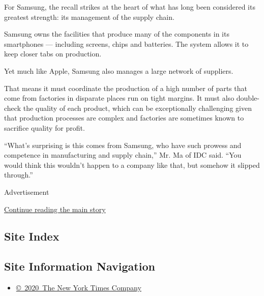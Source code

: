 For Samsung, the recall strikes at the heart of what has long been
considered its greatest strength: its management of the supply chain.

Samsung owns the facilities that produce many of the components in its
smartphones --- including screens, chips and batteries. The system
allows it to keep closer tabs on production.

Yet much like Apple, Samsung also manages a large network of suppliers.

That means it must coordinate the production of a high number of parts
that come from factories in disparate places run on tight margins. It
must also double-check the quality of each product, which can be
exceptionally challenging given that production processes are complex
and factories are sometimes known to sacrifice quality for profit.

``What's surprising is this comes from Samsung, who have such prowess
and competence in manufacturing and supply chain,'' Mr. Ma of IDC said.
``You would think this wouldn't happen to a company like that, but
somehow it slipped through.''

Advertisement

\protect\hyperlink{after-bottom}{Continue reading the main story}

\hypertarget{site-index}{%
\subsection{Site Index}\label{site-index}}

\hypertarget{site-information-navigation}{%
\subsection{Site Information
Navigation}\label{site-information-navigation}}

\begin{itemize}
\tightlist
\item
  \href{https://help.nytimes3xbfgragh.onion/hc/en-us/articles/115014792127-Copyright-notice}{©~2020~The
  New York Times Company}
\end{itemize}

